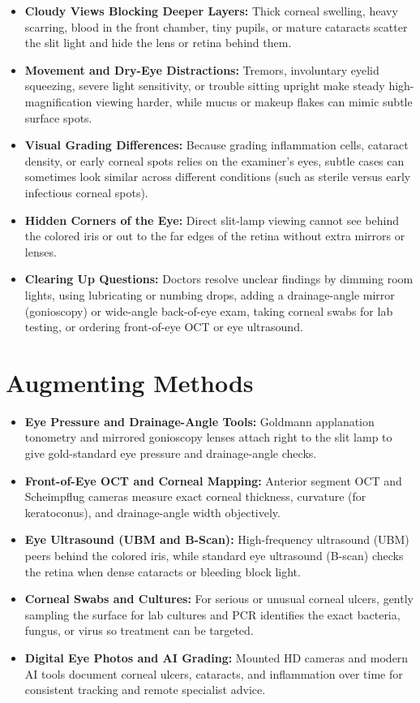 \begin{itemize}
    \item \textbf{Cloudy Views Blocking Deeper Layers:} Thick corneal swelling, heavy scarring, blood in the front chamber, tiny pupils, or mature cataracts scatter the slit light and hide the lens or retina behind them.
    \item \textbf{Movement and Dry-Eye Distractions:} Tremors, involuntary eyelid squeezing, severe light sensitivity, or trouble sitting upright make steady high-magnification viewing harder, while mucus or makeup flakes can mimic subtle surface spots.
    \item \textbf{Visual Grading Differences:} Because grading inflammation cells, cataract density, or early corneal spots relies on the examiner's eyes, subtle cases can sometimes look similar across different conditions (such as sterile versus early infectious corneal spots).
    \item \textbf{Hidden Corners of the Eye:} Direct slit-lamp viewing cannot see behind the colored iris or out to the far edges of the retina without extra mirrors or lenses.
    \item \textbf{Clearing Up Questions:} Doctors resolve unclear findings by dimming room lights, using lubricating or numbing drops, adding a drainage-angle mirror (gonioscopy) or wide-angle back-of-eye exam, taking corneal swabs for lab testing, or ordering front-of-eye OCT or eye ultrasound.
\end{itemize}

\section{Augmenting Methods}

\begin{itemize}
    \item \textbf{Eye Pressure and Drainage-Angle Tools:} Goldmann applanation tonometry and mirrored gonioscopy lenses attach right to the slit lamp to give gold-standard eye pressure and drainage-angle checks.
    \item \textbf{Front-of-Eye OCT and Corneal Mapping:} Anterior segment OCT and Scheimpflug cameras measure exact corneal thickness, curvature (for keratoconus), and drainage-angle width objectively.
    \item \textbf{Eye Ultrasound (UBM and B-Scan):} High-frequency ultrasound (UBM) peers behind the colored iris, while standard eye ultrasound (B-scan) checks the retina when dense cataracts or bleeding block light.
    \item \textbf{Corneal Swabs and Cultures:} For serious or unusual corneal ulcers, gently sampling the surface for lab cultures and PCR identifies the exact bacteria, fungus, or virus so treatment can be targeted.
    \item \textbf{Digital Eye Photos and AI Grading:} Mounted HD cameras and modern AI tools document corneal ulcers, cataracts, and inflammation over time for consistent tracking and remote specialist advice.
\end{itemize}

